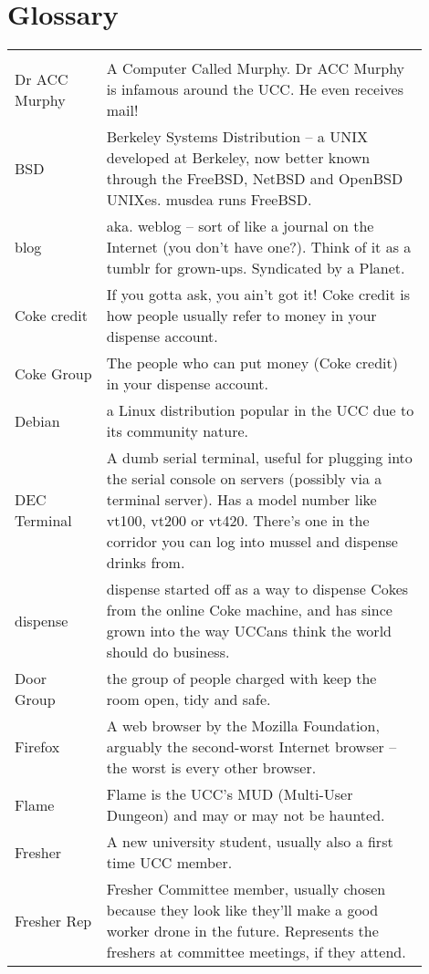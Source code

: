 \chapter{Glossary}

\small{
\begin{tabular}{p{0.2\linewidth}|p{0.7\linewidth}}
	\rowcolor{black} \color{white}{Term} & \color{white}{Translation} \\
Dr ACC Murphy &
A Computer Called Murphy. Dr ACC Murphy is infamous around the UCC. He even receives mail! \\
BSD &
Berkeley Systems Distribution -- a UNIX developed at Berkeley, now better known through the FreeBSD, NetBSD and OpenBSD UNIXes. musdea runs FreeBSD. \\
blog &
aka. weblog -- sort of like a journal on the Internet (you don't have one?). Think of it as  a tumblr for grown-ups. Syndicated by a Planet. \\
Coke credit & 
If you gotta ask, you ain't got it! Coke credit is how people usually refer to money in your dispense account. \\
Coke Group &
The people who can put money (Coke credit) in your dispense account. \\
Debian &
a Linux distribution popular in the UCC due to its community nature. \\
DEC Terminal &
A dumb serial terminal, useful for plugging into the serial console on servers (possibly via a terminal server). Has a model number like vt100, vt200 or vt420. There's one in the corridor you can log into mussel and dispense drinks from. \\
dispense &
dispense started off as a way to dispense Cokes from the online Coke machine, and has since grown into the way UCCans think the world should do business. \\
Door Group &
the group of people charged with keep the room open, tidy and safe. \\
Firefox &
A web browser by the Mozilla Foundation, arguably the second-worst Internet browser -- the worst is every other browser. \\
Flame &
Flame is the UCC's MUD (Multi-User Dungeon) and may or may not be haunted. \\
Fresher &
A new university student, usually also a first time UCC member. \\
Fresher Rep &
Fresher Committee member, usually chosen because they look like they'll make a good worker drone in the future. Represents the freshers at committee meetings, if they attend. \\

\end{tabular}}

